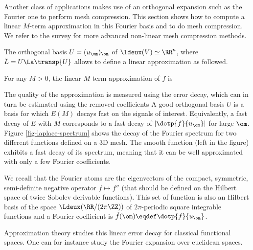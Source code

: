 Another class of applications makes use of an orthogonal expansion such as the Fourier one to perform mesh compression. This section shows how to compute a linear $M$-term approximation in this Fourier basis and to do mesh compression. We refer to the survey \cite{alliez-compression-survey} for more advanced non-linear mesh compression methods.

The orthogonal basis $U=(u_\om)_\om$ of $\ldeux(V) \simeq \RR^n$, where $\tilde L = U \La \transp{U}$ allows to define a linear approximation as followed.

\begin{defn} For any $M>0$, the linear $M$-term approximation of $f$ is
\end{defn}

The quality of the approximation is measured using the error decay, which can in turn be estimated using the removed coefficients
A good orthogonal basis $U$ is a basis for which $E(M)$ decays fast on the signals of interest. Equivalently, a fast decay of $E$ with $M$ corresponds to a fast decay of $|\dotp{f}{u_\om}|$ for large $\om$.  Figure \ref{fig-laplace-spectrum} shows the decay of the Fourier spectrum for two different functions defined on a 3D mesh. The smooth function (left in the figure) exhibits a fast decay of its spectrum, meaning that it can be well approximated with only a few Fourier coefficients.


We recall that the Fourier atoms
are the eigenvectors of the compact, symmetric, semi-definite negative operator $f \mapsto f''$ (that should be defined on the Hilbert space of twice Sobolev derivable functions). This set of function is also an Hilbert basis of the space $\Ldeux(\RR/(2\pi\ZZ))$ of $2\pi$-periodic square integrable functions and a Fourier coefficient is $\hat f(\om) \eqdef \dotp{f}{u_\om}$.

Approximation theory studies this linear error decay for classical functional spaces. One can for instance study the Fourier expansion over euclidean spaces. 

